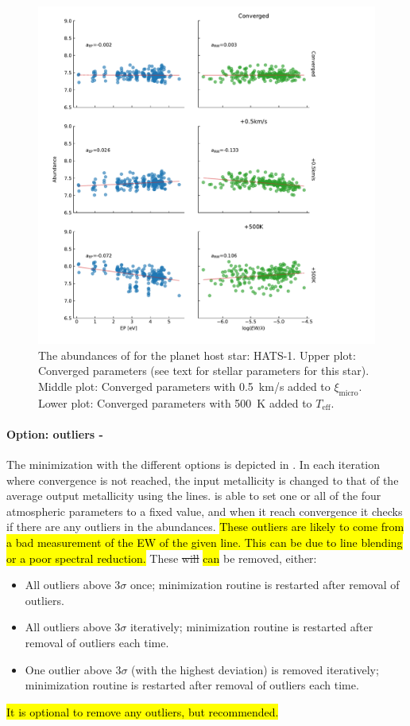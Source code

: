 \begin{figure}[htpb!]
    \centering
    \includegraphics[width=0.85\linewidth]{figures/EP_RW_vs_abundance.pdf}
    \caption{The abundances of  for the planet host star: HATS-1.
             Upper plot: Converged parameters (see text for stellar parameters for this star).
             Middle plot: Converged parameters with \SI{0.5}{km/s} added to $\xi_\mathrm{micro}$.
             Lower plot: Converged parameters with \SI{500}{K} added to $T_\mathrm{eff}$.}
    \label{fig:eprw}
\end{figure}

\paragraph{Option: outliers - }

The minimization with the different options is depicted in . In each
iteration where convergence is not reached, the input metallicity is changed to that of the average
output metallicity using the  lines.  is able to set one or all of the four
atmospheric parameters to a fixed value, and when it reach convergence it checks if there are any
outliers in the abundances. \hl{These outliers are likely to come from a bad measurement of the EW
of the given line. This can be due to line blending or a poor spectral reduction.} These \st{will}
\hl{can} be removed, either:
\begin{itemize}
  \item All outliers above $3\sigma$ once; minimization routine is restarted after removal of
        outliers.
  \item All outliers above $3\sigma$ iteratively; minimization routine is restarted after removal of
        outliers each time.
  \item One outlier above $3\sigma$ (with the highest deviation) is removed iteratively;
        minimization routine is restarted after removal of outliers each time.
\end{itemize}
\hl{It is optional to remove any outliers, but recommended.}

